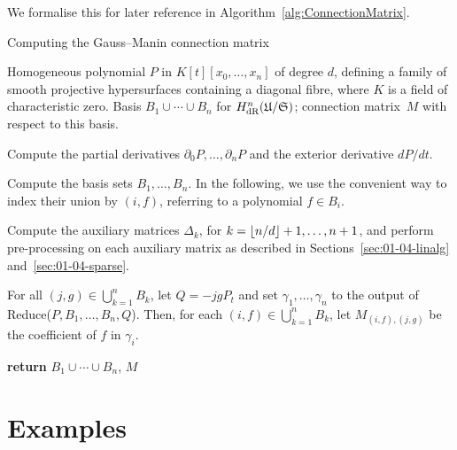 We formalise this for later reference in Algorithm~\ref{alg:ConnectionMatrix}.

\begin{algorithm}
\caption{Computing the Gauss--Manin connection matrix}
\label{alg:ConnectionMatrix}
\begin{algorithmic}
\Require Homogeneous polynomial $P$ in $K[t][x_0, \dotsc, x_n]$ of degree $d$, 
         defining a family of smooth projective hypersurfaces containing 
         a diagonal fibre, where $K$ is a field of characteristic zero.
\Ensure  Basis $B_1 \cup \dotsb \cup B_n$ for 
         $H_{\text{dR}}^n(\mathfrak{U}/\mathfrak{S})$;  connection matrix~$M$ with 
         respect to this basis.
\State \begin{compactenum}[\it {Step} I.] \vspace{-1.24em}
\item Compute the partial derivatives $\partial_0 P, \dotsc, \partial_n P$ and 
      the exterior derivative $dP/dt$.
\item Compute the basis sets $B_1, \dotsc, B_n$.  In the following, we use the 
      convenient way to index their union by $(i,f)$, referring to a 
      polynomial $f \in B_i$.
\item Compute the auxiliary matrices $\Delta_k$, for 
      $k = \left\lfloor n/d\right\rfloor+1, \dotsc, n+1$, and perform pre-processing on each 
      auxiliary matrix as described in 
      Sections~\ref{sec:01-04-linalg} 
      and~\ref{sec:01-04-sparse}.
\item For all $(j, g) \in \bigcup_{k=1}^n B_k$, let $Q = -j g P_t$ and set 
      $\gamma_{1}, \dotsc, \gamma_n$ to the output of 
      {\sc Reduce($P, B_1, \dotsc, B_n, Q$)}.  
      Then, for each $(i, f) \in \bigcup_{k=1}^n B_k$, let $M_{(i,f),(j,g)}$ 
      be the coefficient of $f$ in $\gamma_i$.
\item \textbf{return} $B_1 \cup \dotsb \cup B_n$, $M$
\end{compactenum}
\EndProcedure
\end{algorithmic}
\end{algorithm}


\section{Examples}

